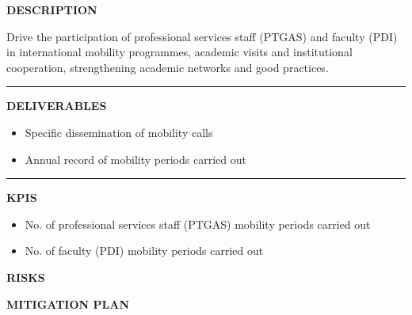 \documentclass[11pt,a4paper]{scrreprt}
\newcommand{\fieldlabel}[1]{%
  {\footnotesize\sffamily\bfseries\color{mutedcolor}\MakeUppercase{#1}}\par\nopagebreak[4]
}
\newcommand{\fieldsep}{\vspace{3pt}\noindent\textcolor{bordercolor}{\rule{\linewidth}{0.4pt}}\vspace{3pt}\par}
\begin{document}
\begin{tcolorbox}[pabox={fgcolor}{A.P.5.2 \enspace\textbullet\enspace Foster Professional Services Staff (PTGAS) and Faculty (PDI) Mobility}]

\fieldlabel{Description}
{\small Drive the participation of professional services staff (PTGAS) and faculty (PDI) in international mobility programmes, academic visits and institutional cooperation, strengthening academic networks and good practices.}\par
\fieldsep
\fieldlabel{Deliverables}
{\small \begin{itemize}[noitemsep,topsep=2pt]
\item Specific dissemination of mobility calls
\item Annual record of mobility periods carried out
\end{itemize}}\par
\fieldsep
\fieldlabel{KPIs}
{\small \begin{itemize}[noitemsep,topsep=2pt]
\item No. of professional services staff (PTGAS) mobility periods carried out
\item No. of faculty (PDI) mobility periods carried out
\end{itemize}}\par
\end{tcolorbox}
\begin{tcolorbox}[riskbox]
{\footnotesize\sffamily\bfseries\color{red!50!black} RISKS}\par{}
\end{tcolorbox}
\begin{tcolorbox}[mitbox]
{\footnotesize\sffamily\bfseries\color{green!40!black} MITIGATION PLAN}\par{}
\end{tcolorbox}
\vspace{8pt}
\end{document}
